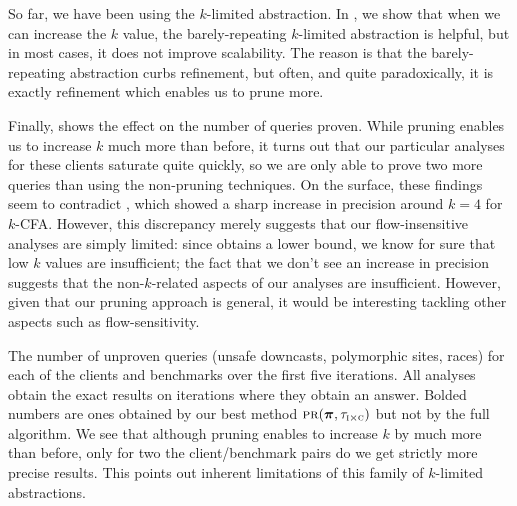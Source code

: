 So far, we have been using the $k$-limited abstraction.  In
, we show that when we can increase the $k$
value, the barely-repeating $k$-limited abstraction is helpful, but in most
cases, it does not improve scalability.  The reason is that the
barely-repeating abstraction curbs refinement, but often, and quite
paradoxically, it is exactly refinement which enables us to prune more.


Finally,  shows the effect on the number of queries proven.
While pruning enables us to increase $k$ much more than before, it turns out
that our particular analyses for these clients saturate quite quickly, so we
are only able to prove two more queries than using the non-pruning techniques.
On the surface, these findings seem to contradict \cite{liang10abstraction},
which showed a sharp increase in precision around $k=4$ for $k$-CFA.  However,
this discrepancy merely suggests that our flow-insensitive analyses are simply
limited: since \cite{liang10abstraction} obtains a lower bound, we know for
sure that low $k$ values are insufficient; the fact that we don't see an
increase in precision suggests that the non-$k$-related aspects of our analyses
are insufficient.  However, given that our pruning approach is general, it
would be interesting tackling other aspects such as flow-sensitivity.

\begin{table}
\small
\centering

\caption{\label{tab:numUnproven} The number of unproven queries (unsafe
downcasts, polymorphic sites, races) for each of the clients and benchmarks
over the first five iterations.
All analyses obtain the exact results on iterations where they obtain an answer.
Bolded numbers are ones obtained by our best method $\text{\sc pr}(\mbox{\boldmath$\pi$},\tau_{\text{\sc i} \times \text{\sc c}})$
but not by the full algorithm.
We see that although pruning enables to increase $k$ by much more than before,
only for two the client/benchmark pairs do we get strictly more precise results.
This points out inherent limitations of this family of $k$-limited abstractions.
}
\end{table}
